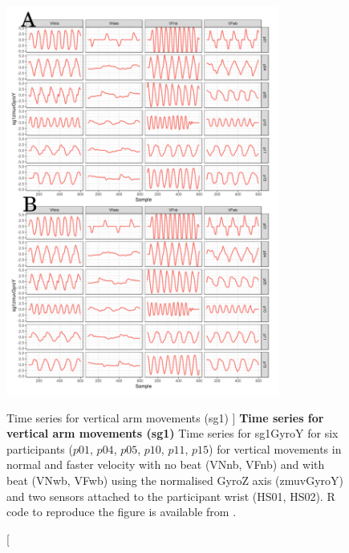 \begin{figure}
\centering
\includegraphics[width=0.8\textwidth]{tssg1gyroY}
	\caption
	[Time series for vertical arm movements (sg1) ]{
	{\bf Time series for vertical arm movements (sg1)}
		Time series for sg1GyroY for six participants 
		($p01$, $p04$, $p05$, $p10$, $p11$, $p15$) 
		for vertical movements in normal and faster velocity with
		no beat	(VNnb, VFnb) and with beat (VNwb, VFwb) using 
		the normalised GyroZ axis (zmuvGyroY) and 
		two sensors attached to the participant wrist (HS01, HS02).
	R code to reproduce the figure is available from \cite{xochicale2018}.
	}
    \label{fig:tssg1gyroY-hii}
\end{figure}



